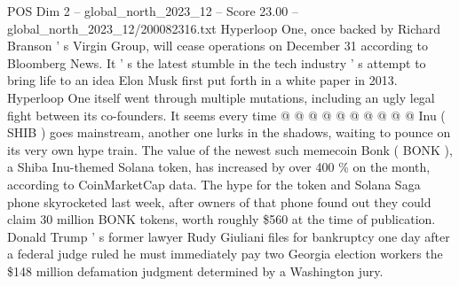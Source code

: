 \begin{textsample}{POS Dim 2 – global\_north\_2023\_12 – Score 23.00 – global\_north\_2023\_12/200082316.txt}
Hyperloop One, once backed by Richard Branson ' s Virgin Group, will cease operations on December 31 according to Bloomberg News.
It ' s the latest stumble in the tech industry ' s attempt to bring life to an idea Elon Musk first put forth in a white paper in 2013.
Hyperloop One itself went through multiple mutations, including an ugly legal fight between its co-founders.
It seems every time @ @ @ @ @ @ @ @ @ @ Inu ( SHIB ) goes mainstream, another one lurks in the shadows, waiting to pounce on its very own hype train.
The value of the newest such memecoin Bonk ( BONK ), a Shiba Inu-themed Solana token, has increased by over 400 \% on the month, according to CoinMarketCap data.
The hype for the token and Solana Saga phone skyrocketed last week, after owners of that phone found out they could claim 30 million BONK tokens, worth roughly \$560 at the time of publication.
Donald Trump ' s former lawyer Rudy Giuliani files for bankruptcy one day after a federal judge ruled he must immediately pay two Georgia election workers the \$148 million defamation judgment determined by a Washington jury.

\end{textsample}
